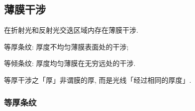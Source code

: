 \documentclass{ctexart}
\begin{document}



\subsection{薄膜干涉} %
\label{sub:薄膜干涉}

在折射光和反射光交迭区域内存在薄膜干涉.
\begin{cenum}
    \item 等厚条纹: 厚度不均匀薄膜表面处的干涉;
    \item 等倾条纹: 厚度均匀薄膜在无穷远处的干涉.
\end{cenum}
\begin{pitfall}
    等厚干涉之「厚」非谓膜的厚, 而是光线「经过相同的厚度」.
\end{pitfall}

\subsubsection{等厚条纹} %
\label{ssub:等厚条纹}
\end{document}
